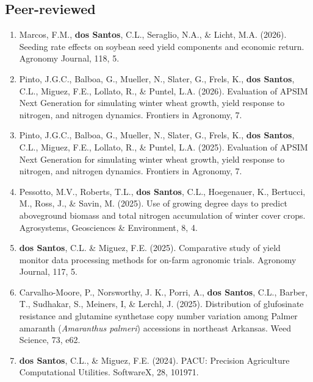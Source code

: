\documentclass[letterpaper,10pt]{article}
\begin{document}
\subsection*{\sc Peer-reviewed}
\begin{enumerate}
\vspace*{.05in}  

\item Marcos, F.M., {\bf dos Santos}, C.L.,
	Seraglio, N.A., \& Licht, M.A.  (2026).
	Seeding rate effects on soybean seed yield
	components and economic return. Agronomy
	Journal, 118, 5.

\item Pinto, J.G.C., Balboa, G., Mueller, N.,
	Slater, G., Frels, K., {\bf dos Santos},
	C.L., Miguez, F.E., Lollato, R., \&
	Puntel, L.A. (2026).  Evaluation of APSIM
	Next Generation for simulating winter
	wheat growth, yield response to nitrogen,
	and nitrogen dynamics. Frontiers in
	Agronomy, 7.

\item Pinto, J.G.C., Balboa, G., Mueller, N.,
	Slater, G., Frels, K., {\bf dos Santos},
	C.L., Miguez, F.E., Lollato, R., \&
	Puntel, L.A. (2025).  Evaluation of APSIM
	Next Generation for simulating winter
	wheat growth, yield response to nitrogen,
	and nitrogen dynamics. Frontiers in
	Agronomy, 7.

\item Pessotto, M.V., Roberts, T.L., {\bf dos
	Santos}, C.L., Hoegenauer, K., Bertucci,
	M., Ross, J., \& Savin, M. (2025). Use of
	growing degree days to predict aboveground
	biomass and total nitrogen accumulation of
	winter cover crops. Agrosystems,
	Geosciences \& Environment, 8, 4.

\item {\bf dos Santos}, C.L. \& Miguez, F.E.
	(2025).  Comparative study of yield
	monitor data processing methods for
	on-farm agronomic trials. Agronomy
	Journal, 117, 5.

\item Carvalho-Moore, P.,  Norsworthy, J. K.,
	Porri, A., {\bf dos Santos}, C.L., Barber,
	T., Sudhakar, S., Meiners, I, \& Lerchl, J.
	(2025). Distribution of glufosinate
	resistance and glutamine synthetase copy
	number variation among Palmer amaranth
	(\textit{Amaranthus palmeri}) accessions
	in northeast Arkansas. Weed
	Science, 73, e62. 

\item {\bf dos Santos}, C.L., \& Miguez, F.E.
	(2024). PACU: Precision Agriculture
	Computational Utilities. SoftwareX, 28,
	101971.


\end{enumerate}
\end{document}
